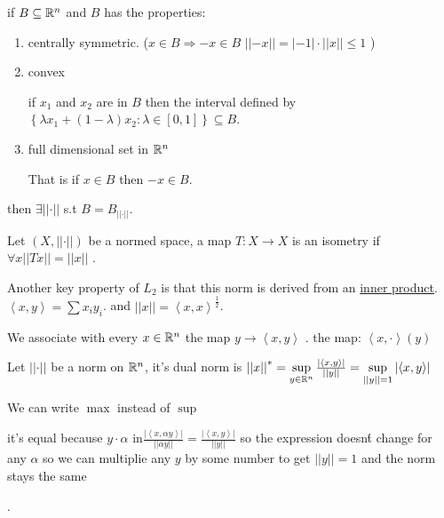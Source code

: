 \begin{proposition}
if $B\subseteq\mathbb{R}^{n}$ and $B$ has the properties: 
\begin{enumerate}
\item centrally symmetric. ($x\in B\Rightarrow-x\in B$ $\left|\left|-x\right|\right|=\left|-1\right|\cdot\left|\left|x\right|\right|\le1$
)
\item convex %
\begin{insight}
if $x_{1}$ and $x_{2}$ are in $B$ then the interval defined by
$\left\{ \lambda x_{1}+\left(1-\lambda\right)x_{2}:\lambda\in\left[0,1\right]\right\} \subseteq B$.%
\end{insight}
\item full dimensional set in $\mathbb{R}^{n}$ %
\begin{insight}
That is if $x\in B$ then $-x\in B$.%
\end{insight}
{} 
\end{enumerate}
then $\exists\left|\left|\cdot\right|\right|$ s.t $B=B_{\left|\left|\cdot\right|\right|}$.

\end{proposition}

\begin{definition}[isometry]
 Let $\left(X,\left|\left|\cdot\right|\right|\right)$ be a normed
space, a map $T:X\to X$ is an isometry if $\forall x\left|\left|Tx\right|\right|=\left|\left|x\right|\right|$
.
\end{definition}

Another key property of $L_{2}$ is that this norm is derived from
an \uline{inner product}. $\left\langle x,y\right\rangle =\sum x_{i}y_{i}$.
and $\left|\left|x\right|\right|=$$\left\langle x,x\right\rangle ^{\frac{1}{2}}$.

We associate with every $x\in\mathbb{R}^{n}$ the map $y\to\left\langle x,y\right\rangle $
. the map: $\left\langle x,\cdot\right\rangle \left(y\right)$
\begin{definition}
 Let $\left|\left|\cdot\right|\right|$ be a norm on $\mathbb{R}^{n}$, it's
dual norm is $\left|\left|x\right|\right|^{*}=\sup\limits _{y\in\mathbb{R}^{n}}\frac{\left|\left\langle x,y\right\rangle \right|}{\left|\left|y\right|\right|}=\sup\limits _{\left|\left|y\right|\right|=1}\left|\left\langle x,y\right\rangle \right|$%
\begin{insight}
We can write $\max$ instead of $\sup$%
\end{insight}
{} %
\begin{insight}
it's equal because $y\cdot\alpha$ in$\frac{\left|\left\langle x,\alpha y\right\rangle \right|}{\left|\left|\alpha y\right|\right|}=\frac{\left|\left\langle x,y\right\rangle \right|}{\left|\left|y\right|\right|}$
so the expression doesn\'{t} change for any $\alpha$ so we can multiplie
any $y$ by some number to get $\left|\left|y\right|\right|=1$ and
the norm stays the same%
\end{insight}
.
\end{definition}


